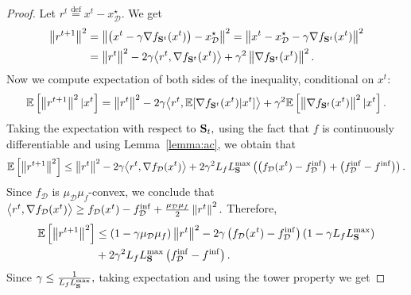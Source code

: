 \documentclass{article}
\newcommand{\bb}{\mathbb}
\newcommand{\cD}{\mathcal{D}}
\newcommand{\eqdef}{\stackrel{\text{def}}{=}}
\newcommand{\Exp}[1]{{\bb E}\left[#1\right]}
\theoremstyle{plain}
\newcommand{\tf}{f_{\mathcal{D}}}
\newcommand{\mS}{{\bf S}}
\theoremstyle{plain}
\theoremstyle{definition}
\theoremstyle{remark}
\begin{document}
\begin{proof}
Let $r^t\eqdef x^t - x_\cD^\star.$ We get
\begin{equation*}
	\begin{split}
		\left\|r^{t+1}\right\|^2 & = \left\|\left(x^t-\gamma \nabla f_{\mS^{t}}(x^t) \right) - x_\cD^\star\right\|^2  = \left\|x^t-x_\cD^\star - \gamma \nabla f_{\mS^{t}}(x^t)\right\|^2 \\
		& = \left\|r^{t}\right\|^2 - 2\gamma\big{<}r^t, \nabla f_{\mS^{t}}(x^t)\big{>} + \gamma^2\left\|\nabla f_{\mS^{t}}(x^t)\right\|^2.
	\end{split}
\end{equation*}
Now we compute expectation of both sides of the inequality, conditional on $x^t:$
\begin{equation*}
	\mathbb{E}\left[\left\|r^{t+1}\right\|^2|x^t\right] = \left\|r^{t}\right\|^2 - 2\gamma\big{<}r^t, \mathbb{E}[\nabla f_{\mS^{t}}(x^t)|x^t]\big{>} + \gamma^2\mathbb{E}\left[\left\|\nabla f_{\mS^{t}}(x^t)\right\|^2|x^t\right].
\end{equation*}
Taking the expectation with respect to $\mS_t,$ using the fact that $f$ is continuously differentiable and using Lemma~\ref{lemma:ac}, we obtain that
\begin{equation*}
	\begin{split}
		\mathbb{E}\left[\left\|r^{t+1}\right\|^2\right] & \leq \left\|r^{t}\right\|^2 - 2\gamma\big{<}r^t, \nabla \tf(x^t)\big{>} + 2\gamma^2L_fL_{\mS}^{\max}\left(\left(\tf(x^t) - \tf^{\inf}\right)+  \left(\tf^{\inf} - f^{\inf}\right)\right).\\
	\end{split}
\end{equation*}
Since $\tf$ is $\mu_{\mathcal{D}}\mu_f$-convex, we conclude that $\big{<}r^t, \nabla \tf(x^t)\big{>}\geq \tf(x^t) - \tf^{\inf} + \frac{\mu_{\mathcal{D}}\mu_f}{2}\left\|r^t\right\|^2.$ Therefore,
\begin{equation*}
	\begin{split}
		\Exp{\left\|r^{t+1}\right\|^2} & \leq \left(1-\gamma\mu_{\mathcal{D}}\mu_f\right)\left\|r^{t}\right\|^2 - 2\gamma\left(\tf(x^t) - \tf^{\inf}\right)\left(1-\gamma L_fL_{\mS}^{\max} \right)\\
		&+ 2\gamma^2L_fL_{\mS}^{\max}\left(\tf^{\inf} - f^{\inf}\right).\\
	\end{split}
\end{equation*}
Since $\gamma \leq \frac{1}{L_fL_{\mS}^{\max}},$ taking expectation and using the tower property we get

\end{proof}
\end{document}
